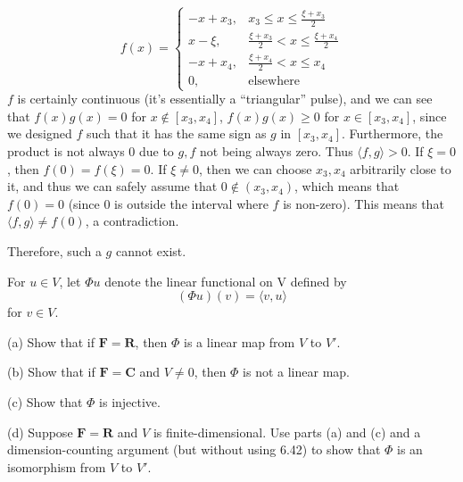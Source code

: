\begin{solution}
    $$f(x) = \begin{cases} -x + x_3, & x_3 \leq x \leq \frac{\xi + x_3}{2} \\ x - \xi, & \frac{\xi + x_3}{2} < x \leq \frac{\xi + x_4}{2} \\ -x + x_4, & \frac{\xi + x_4}{2} < x \leq x_4 \\ 0, & \text{elsewhere} \end{cases}$$
    $f$ is certainly continuous (it's essentially a ``triangular'' pulse), and we can see that $f(x)g(x) = 0$ for $x \notin [x_3, x_4]$, $f(x)g(x) \geq 0$ for $x \in [x_3, x_4]$, since we designed $f$ such that it has the same sign as $g$ in $[x_3, x_4]$. Furthermore, the product is not always 0 due to $g, f$ not being always zero. Thus $\langle f, g \rangle > 0$. If $\xi = 0$, then $f(0) = f(\xi) = 0$. If $\xi \neq 0$, then we can choose $x_3, x_4$ arbitrarily close to it, and thus we can safely assume that $0 \notin (x_3, x_4)$, which means that $f(0) = 0$ (since 0 is outside the interval where $f$ is non-zero). This means that $\langle f, g \rangle \neq f(0)$, a contradiction.

    Therefore, such a $g$ cannot exist.

\end{solution}

\begin{exercise}{17}
    For $u \in V$, let $\Phi u$ denote the linear functional on V defined by
    $$(\Phi u)(v) = \langle v, u \rangle$$
    for $v \in V$.

    (a) Show that if $\mathbf{F} = \mathbf{R}$, then $\Phi$ is a linear map from $V$ to $V'$.

    (b) Show that if $\mathbf{F} = \mathbf{C}$ and $V \neq {0}$, then $\Phi$ is not a linear map.

    (c) Show that $\Phi$ is injective.

    (d) Suppose $\mathbf{F} = \mathbf{R}$ and $V$ is finite-dimensional. Use parts (a) and (c) and a dimension-counting argument (but without using 6.42) to show that $\Phi$ is an isomorphism from $V$ to $V'$.
\end{exercise}

